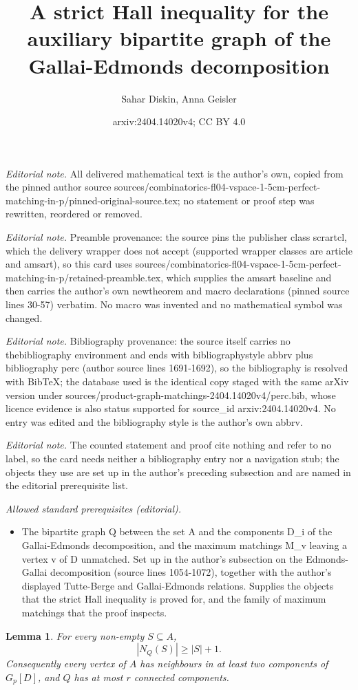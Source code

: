\documentclass[10pt,a4paper]{amsart}
\title{A strict Hall inequality for the auxiliary bipartite graph of the Gallai-Edmonds decomposition}
\author{Sahar Diskin, Anna Geisler}
\date{arxiv:2404.14020v4; CC BY 4.0}
\newtheorem{lemma}[thm]{Lemma}
\begin{document}
\maketitle
\noindent\textit{Editorial note.} All delivered mathematical text is the author's own, copied from the pinned author source sources/combinatorics-fl04-vspace-1-5cm-perfect-matching-in-p/pinned-original-source.tex; no statement or proof step was rewritten, reordered or removed.\par\medskip
\noindent\textit{Editorial note.} Preamble provenance: the source pins the publisher class scrartcl, which the delivery wrapper does not accept (supported wrapper classes are article and amsart), so this card uses sources/combinatorics-fl04-vspace-1-5cm-perfect-matching-in-p/retained-preamble.tex, which supplies the amsart baseline and then carries the author's own newtheorem and macro declarations (pinned source lines 30-57) verbatim. No macro was invented and no mathematical symbol was changed.\par\medskip
\noindent\textit{Editorial note.} Bibliography provenance: the source itself carries no thebibliography environment and ends with bibliographystyle abbrv plus bibliography perc (author source lines 1691-1692), so the bibliography is resolved with BibTeX; the database used is the identical copy staged with the same arXiv version under sources/product-graph-matchings-2404.14020v4/perc.bib, whose licence evidence is also status supported for source\_id arxiv:2404.14020v4. No entry was edited and the bibliography style is the author's own abbrv.\par\medskip
\noindent\textit{Editorial note.} The counted statement and proof cite nothing and refer to no label, so the card needs neither a bibliography entry nor a navigation stub; the objects they use are set up in the author's preceding subsection and are named in the editorial prerequisite list.\par\medskip
\noindent\textit{Allowed standard prerequisites (editorial).}\begin{itemize}
\item The bipartite graph Q between the set A and the components D\_i of the Gallai-Edmonds decomposition, and the maximum matchings M\_v leaving a vertex v of D unmatched. Set up in the author's subsection on the Edmonds-Gallai decomposition (source lines 1054-1072), together with the author's displayed Tutte-Berge and Gallai-Edmonds relations. Supplies the objects that the strict Hall inequality is proved for, and the family of maximum matchings that the proof inspects.
\end{itemize}\medskip
\begin{lemma}\label{lem:strict-hall}
For every non-empty $S\subseteq A$,
\[
 |N_Q(S)|\ge|S|+1.
\]
Consequently every vertex of $A$ has neighbours in at least two components of $G_p[D]$, and $Q$ has at most $r$ connected components.
\end{lemma}
\end{document}
